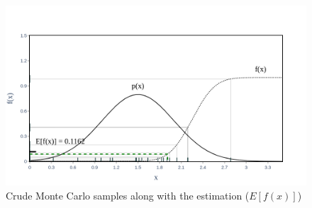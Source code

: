     \begin{figure}[H]
        \centering
        \includegraphics[scale=0.30]{Figures/Images/Illustrative Example/crude_MC.png}
        \caption{Crude Monte Carlo samples along with the estimation ($E[f(x)]$)}
        \label{fig:crude_MC}
    \end{figure}